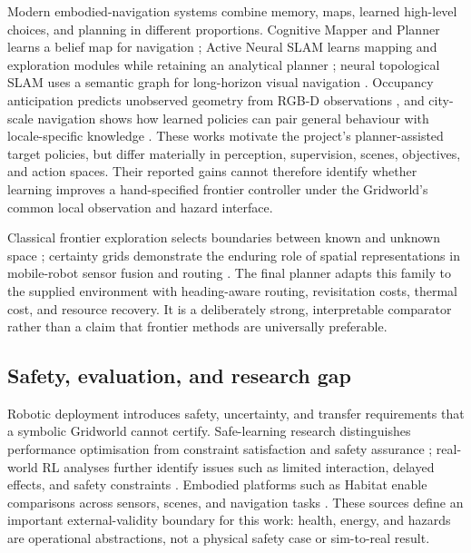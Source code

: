 \documentclass[10pt,letterpaper]{article}
\begin{document}
Modern embodied-navigation systems combine memory, maps, learned high-level choices, and planning in different proportions. Cognitive Mapper and Planner learns a belief map for navigation \citep{gupta2017cognitive}; Active Neural SLAM learns mapping and exploration modules while retaining an analytical planner \citep{chaplot2020activeslam}; neural topological SLAM uses a semantic graph for long-horizon visual navigation \citep{chaplot2020topological}. Occupancy anticipation predicts unobserved geometry from RGB-D observations \citep{ramakrishnan2020occupancy}, and city-scale navigation shows how learned policies can pair general behaviour with locale-specific knowledge \citep{mirowski2018cities}. These works motivate the project's planner-assisted target policies, but differ materially in perception, supervision, scenes, objectives, and action spaces. Their reported gains cannot therefore identify whether learning improves a hand-specified frontier controller under the Gridworld's common local observation and hazard interface.

Classical frontier exploration selects boundaries between known and unknown space \citep{yamauchi1997frontier}; certainty grids demonstrate the enduring role of spatial representations in mobile-robot sensor fusion and routing \citep{moravec1988certainty}. The final planner adapts this family to the supplied environment with heading-aware routing, revisitation costs, thermal cost, and resource recovery. It is a deliberately strong, interpretable comparator rather than a claim that frontier methods are universally preferable.

\subsection{Safety, evaluation, and research gap}

Robotic deployment introduces safety, uncertainty, and transfer requirements that a symbolic Gridworld cannot certify. Safe-learning research distinguishes performance optimisation from constraint satisfaction and safety assurance \citep{brunke2022safe}; real-world RL analyses further identify issues such as limited interaction, delayed effects, and safety constraints \citep{dulacarnold2019challenges}. Embodied platforms such as Habitat enable comparisons across sensors, scenes, and navigation tasks \citep{savva2019habitat}. These sources define an important external-validity boundary for this work: health, energy, and hazards are operational abstractions, not a physical safety case or sim-to-real result.
\end{document}
